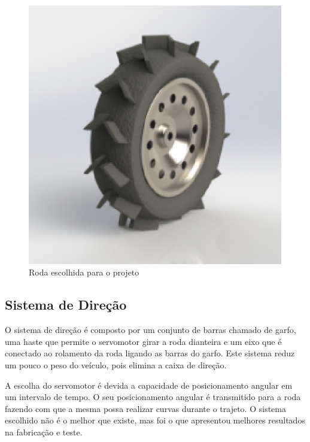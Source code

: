   \begin{figure}[!htbp]
  \begin{center}
  \includegraphics[keepaspectratio=true,scale=0.5]{figuras/wheel.eps}
  \caption{\label{WHEEL}Roda escolhida para o projeto}
  \end{center}
  \end{figure}

  \newpage
  \vfill
  \pagebreak

  \subsection{Sistema de Direção}
    O sistema de direção é composto por um conjunto de barras chamado de garfo, uma haste que permite o servomotor girar a roda dianteira e um eixo que é conectado ao rolamento da roda ligando as barras do garfo. Este sistema reduz um pouco o peso do veículo, pois elimina a caixa de direção. 
     
    A escolha do servomotor é devida a capacidade de posicionamento angular em um intervalo de tempo. O seu posicionamento angular é transmitido para a roda fazendo com que a mesma possa realizar curvas durante o trajeto. O sistema escolhido não é o melhor que existe, mas foi o que apresentou melhores resultados na fabricação e teste. 
    
